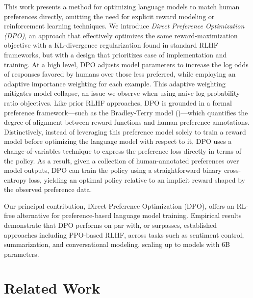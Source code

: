 This work presents a method for optimizing language models to match human preferences directly, omitting the need for explicit reward modeling or reinforcement learning techniques. We introduce \textit{{Direct Preference Optimization} (DPO)}, an approach that effectively optimizes the same reward-maximization objective with a KL-divergence regularization found in standard RLHF frameworks, but with a design that prioritizes ease of implementation and training. At a high level, DPO adjusts model parameters to increase the log odds of responses favored by humans over those less preferred, while employing an adaptive importance weighting for each example. This adaptive weighting mitigates model collapse, an issue we observe when using naive log probability ratio objectives. Like prior RLHF approaches, DPO is grounded in a formal preference framework—such as the Bradley-Terry model (\cite{bradley1952rankanalysis})—which quantifies the degree of alignment between reward functions and human preference annotations. Distinctively, instead of leveraging this preference model solely to train a reward model before optimizing the language model with respect to it, DPO uses a change-of-variables technique to express the preference loss directly in terms of the policy. As a result, given a collection of human-annotated preferences over model outputs, DPO can train the policy using a straightforward binary cross-entropy loss, yielding an optimal policy relative to an implicit reward shaped by the observed preference data.

Our principal contribution, Direct Preference Optimization (DPO), offers an RL-free alternative for preference-based language model training. Empirical results demonstrate that DPO performs on par with, or surpasses, established approaches including PPO-based RLHF, across tasks such as sentiment control, summarization, and conversational modeling, scaling up to models with 6B parameters.

\section{Related Work}


